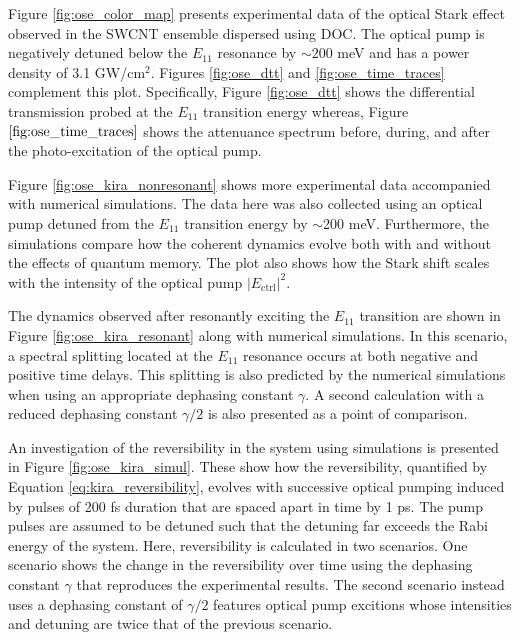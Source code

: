Figure \ref{fig:ose_color_map} presents experimental data of the optical Stark effect observed in the SWCNT ensemble dispersed using DOC. The optical pump is negatively detuned below the $E_{11}$ resonance by $\sim 200$ meV and has a power density of 3.1 GW/cm$^2$. Figures \ref{fig:ose_dtt} and \ref{fig:ose_time_traces} complement this plot. Specifically, Figure \ref{fig:ose_dtt} shows the differential transmission probed at the $E_{11}$ transition energy whereas, Figure $\ref{fig:ose_time_traces}$ shows the attenuance spectrum before, during, and after the photo-excitation of the optical pump.

Figure \ref{fig:ose_kira_nonresonant} shows more experimental data accompanied with numerical simulations. The data here was also collected using an optical pump detuned from the $E_{11}$ transition energy by $\sim$200 meV. Furthermore, the simulations compare how the coherent dynamics evolve both with and without the effects of quantum memory. The plot also shows how the Stark shift scales with the intensity of the optical pump $|E_\text{ctrl}|^2$.

The dynamics observed after resonantly exciting the $E_{11}$ transition are shown in Figure \ref{fig:ose_kira_resonant} along with numerical simulations. In this scenario, a spectral splitting located at the $E_{11}$ resonance occurs at both negative and positive time delays. This splitting is also predicted by the numerical simulations when using an appropriate dephasing constant $\gamma$. A second calculation with a reduced dephasing constant $\gamma/2$ is also presented as a point of comparison.

An investigation of the reversibility in the system using simulations is presented in Figure \ref{fig:ose_kira_simul}. These show how the reversibility, quantified by Equation \eqref{eq:kira_reversibility}, evolves with successive optical pumping induced by pulses of 200 fs duration that are spaced apart in time by 1 ps. The pump pulses are assumed to be detuned such that the detuning far exceeds the Rabi energy of the system. Here, reversibility is calculated in two scenarios. One scenario shows the change in the reversibility over time using the dephasing constant $\gamma$ that reproduces the experimental results. The second scenario instead uses a dephasing constant of $\gamma/2$ features optical pump excitions whose intensities and detuning are twice that of the previous scenario.

